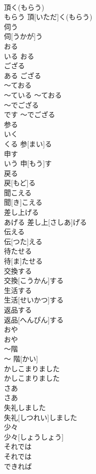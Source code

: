 \documentclass[8pt]{extreport}
\begin{document}
\begin{CJK}{UTF8}{min}
\\	頂く(もらう)	
\\	もらう	頂[いただ]く(もらう)
\\	伺う	
\\	伺[うかが]う
\\	おる	
\\	いる	おる
\\	ござる	
\\	ある	ござる
\\	〜ておる	
\\	〜ている	〜ておる
\\	〜でござる	
\\	です	〜でござる
\\	参る	
\\	いく 
\\	くる	参[まい]る
\\	申す	
\\	いう	申[もう]す
\\	戻る	
\\	戻[もど]る
\\	聞こえる	
\\	聞[き]こえる
\\	差し上げる	
\\	あげる	差し上[さしあ]げる
\\	伝える	
\\	伝[つた]える
\\	待たせる	
\\	待[ま]たせる
\\	交換する	
\\	交換[こうかん]する
\\	生活する	
\\	生活[せいかつ]する
\\	返品する	
\\	返品[へんぴん]する
\\	おや	
\\	おや
\\	〜階	
\\	〜 階[かい]
\\	かしこまりました	
\\	かしこまりました
\\	さあ	
\\	さあ
\\	失礼しました	
\\	失礼[しつれい]しました
\\	少々	
\\	少々[しょうしょう]
\\	それでは	
\\	それでは
\\	できれば	

\end{CJK}
\end{document}
